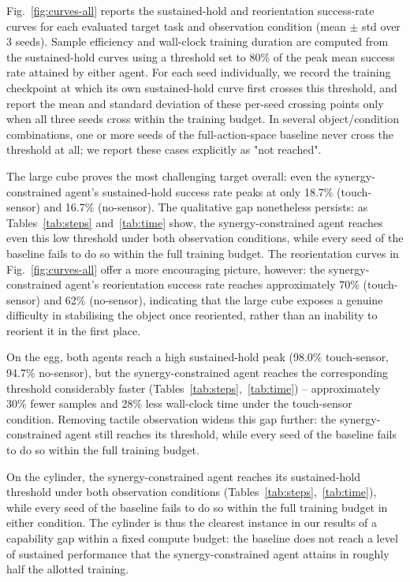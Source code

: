 \documentclass[letterpaper, 10 pt, conference]{ieeeconf}  %
\begin{document}
Fig.~\ref{fig:curves-all} reports the sustained-hold and reorientation success-rate curves for each evaluated target task and observation condition (mean $\pm$ std over 3 seeds). Sample efficiency and wall-clock training duration are computed from the sustained-hold curves using a threshold set to 80\% of the peak mean success rate attained by either agent. For each seed individually, we record the training checkpoint at which its own sustained-hold curve first crosses this threshold, and report the mean and standard deviation of these per-seed crossing points only when all three seeds cross within the training budget. In several object/condition combinations, one or more seeds of the full-action-space baseline never cross the threshold at all; we report these cases explicitly as "not reached".

The large cube proves the most challenging target overall: even the synergy-constrained agent's sustained-hold success rate peaks at only 18.7\% (touch-sensor) and 16.7\% (no-sensor). The qualitative gap nonetheless persists: as Tables~\ref{tab:steps} and~\ref{tab:time} show, the synergy-constrained agent reaches even this low threshold under both observation conditions, while every seed of the baseline fails to do so within the full training budget. The reorientation curves in Fig.~\ref{fig:curves-all} offer a more encouraging picture, however: the synergy-constrained agent's reorientation success rate reaches approximately 70\% (touch-sensor) and 62\% (no-sensor), indicating that the large cube exposes a genuine difficulty in stabilising the object once reoriented, rather than an inability to reorient it in the first place.

On the egg, both agents reach a high sustained-hold peak (98.0\% touch-sensor, 94.7\% no-sensor), but the synergy-constrained agent reaches the corresponding threshold considerably faster (Tables~\ref{tab:steps},~\ref{tab:time}) -- approximately 30\% fewer samples and 28\% less wall-clock time under the touch-sensor condition. Removing tactile observation widens this gap further: the synergy-constrained agent still reaches its threshold, while every seed of the baseline fails to do so within the full training budget.

On the cylinder, the synergy-constrained agent reaches its sustained-hold threshold under both observation conditions (Tables~\ref{tab:steps},~\ref{tab:time}), while every seed of the baseline fails to do so within the full training budget in either condition. The cylinder is thus the clearest instance in our results of a capability gap within a fixed compute budget: the baseline does not reach a level of sustained performance that the synergy-constrained agent attains in roughly half the allotted training.
\end{document}
